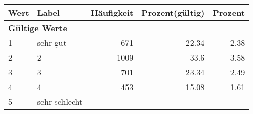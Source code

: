      \begin{longtable}{lXrrr}
     \toprule
     \textbf{Wert} & \textbf{Label} & \textbf{Häufigkeit} & \textbf{Prozent(gültig)} & \textbf{Prozent} \\
     \endhead
     \midrule
     \multicolumn{5}{l}{\textbf{Gültige Werte}}\\

     1 &
     \multicolumn{1}{X}{ sehr gut   } &


       \num{671} &
       \num[round-mode=places,round-precision=2]{22.34} &
         \num[round-mode=places,round-precision=2]{2.38} \\

     2 &
     \multicolumn{1}{X}{ 2   } &


       \num{1009} &
       \num[round-mode=places,round-precision=2]{33.6} &
         \num[round-mode=places,round-precision=2]{3.58} \\

     3 &
     \multicolumn{1}{X}{ 3   } &


       \num{701} &
       \num[round-mode=places,round-precision=2]{23.34} &
         \num[round-mode=places,round-precision=2]{2.49} \\

     4 &
     \multicolumn{1}{X}{ 4   } &


       \num{453} &
       \num[round-mode=places,round-precision=2]{15.08} &
         \num[round-mode=places,round-precision=2]{1.61} \\

     5 &
     \multicolumn{1}{X}{ sehr schlecht   } &



\end{longtable}
